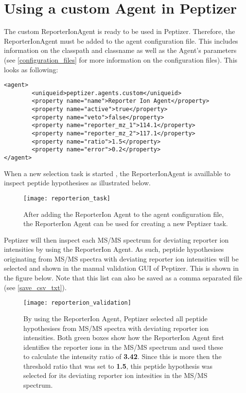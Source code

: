 {\section{Using a custom Agent in Peptizer}
\npar The custom ReporterIonAgent is ready to be used in Peptizer. Therefore, the ReporterIonAgent must be added to the agent configuration file. This includes information on the classpath and classname as well as the Agent's parameters (see \ref{configuration_files} for more information on the configuration files). This looks as following:
%
\begin{verbatim}
<agent>
		<uniqueid>peptizer.agents.custom</uniqueid>
		<property name="name">Reporter Ion Agent</property>
		<property name="active">true</property>
		<property name="veto">false</property>
		<property name="reporter_mz_1">114.1</property>
		<property name="reporter_mz_2">117.1</property>
		<property name="ratio">1.5</property>
		<property name="error">0.2</property>		
</agent>
\end{verbatim}
\npar When a new selection task is started , the ReporterIonAgent is availlable to inspect peptide hypothesises as illustrated below.
%
\begin{figure}[H]
\begin{center}
	\texttt{[image: reporterion\_task]}
	\caption{\label{reporterion_task}After adding the ReporterIon Agent to the agent configuration file, the ReporterIon Agent can be used for creating a new Peptizer task.}
\end{center}
\end{figure}
%
\npar Peptizer will then inspect each MS/MS spectrum for deviating reporter ion intensities by using the ReporterIon Agent. As such, peptide hypothesises originating from MS/MS spectra with deviating reporter ion intensities will be selected and shown in the manual validation GUI of Peptizer. This is shown in the figure below. Note that this list can also be saved as a comma separated file (see \ref{save_csv_txt}).
%
\begin{figure}[H]
\begin{center}
	\texttt{[image: reporterion\_validation]}
	\caption{\label{reporterion_task}By using the ReporterIon Agent, Peptizer selected all peptide hypothesises from MS/MS spectra with deviating reporter ion intensities. Both green boxes show how the ReporterIon Agent first identifies the reporter ions in the MS/MS spectrum and used these to calculate the intensity ratio of \textbf{3.42}. Since this is more then the threshold ratio that was set to \textbf{1.5}, this peptide hypothesis was selected for its deviating reporter ion intesities in the MS/MS spectrum.}
\end{center}
\end{figure}
%
}

